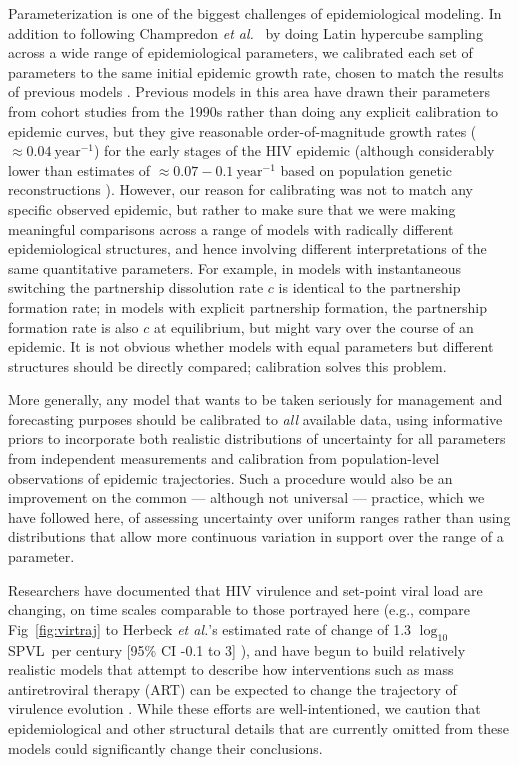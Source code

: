 \documentclass[10pt,letterpaper]{article}
\renewcommand{\figurename}{Fig}
\newcommand{\Lspvl}{$\log_{10}$ SPVL}
\newcommand{\etal}{\textit{et al.}}
\begin{document}
Parameterization is one of the biggest challenges of epidemiological
modeling. In addition to following Champredon \etal\ \cite{champredon_hiv_2013} 
by doing Latin hypercube
sampling across a wide range of epidemiological parameters, we 
calibrated each set of parameters to the same initial epidemic
growth rate, chosen to match the results of previous models
\cite{shirreff_transmission_2011}.  Previous models 
in this area have drawn their
parameters from cohort studies from the 1990s
\cite{wawer2005rates,hollingsworth_hiv1_2008}
rather than doing any explicit calibration to epidemic curves,
but they give reasonable order-of-magnitude
growth rates ($\approx 0.04~\textrm{year}^{-1}$)
for the early stages of the HIV epidemic (although considerably
lower than estimates of $\approx 0.07-0.1~\textrm{year}^{-1}$
based on population genetic reconstructions \cite{faria_early_2014}).
However, our reason for calibrating was not to match any
specific observed epidemic, but rather to make sure that
we were making meaningful comparisons across a range of
models with radically different epidemiological structures, and
hence involving different interpretations of the same quantitative
parameters.  For example, in models with instantaneous switching the
partnership dissolution rate $c$ is identical to the partnership
formation rate; in models with explicit partnership formation,
the partnership formation rate is also $c$ at equilibrium,
but might vary over the course of an epidemic.
It is not obvious whether models with equal parameters but
different structures should be directly compared; calibration
solves this problem.

More generally, any model that wants to be
taken seriously for management and forecasting purposes should
be calibrated to \emph{all} available data, using informative
priors to incorporate both realistic distributions of uncertainty
for all parameters from independent measurements \cite{elderd_uncertainty_2006}
and calibration from population-level observations of epidemic
trajectories. Such a procedure would also be an improvement on the common --- although not universal --- %
practice, which we have followed here,
of assessing uncertainty over uniform ranges rather than
using distributions that allow more continuous variation in support over
the range of a parameter.

Researchers have documented that HIV virulence and set-point viral
load are changing, on time scales comparable to those portrayed here
(e.g., compare \figurename~\ref{fig:virtraj} to Herbeck \etal's
estimated rate of change of 1.3 \Lspvl\ per century [95\% CI -0.1 to
  3] \cite{herbeck_is_2012}), and have begun to build relatively realistic models that
attempt to describe how interventions such as mass antiretroviral
therapy (ART) can be expected to change the trajectory of virulence
evolution \cite{payne_impact_2014,roberts2015impact,herbeck2016evolution}.  While these
efforts are well-intentioned, we caution that epidemiological and
other structural details that are currently omitted from these models
could significantly change their conclusions.
\end{document}
